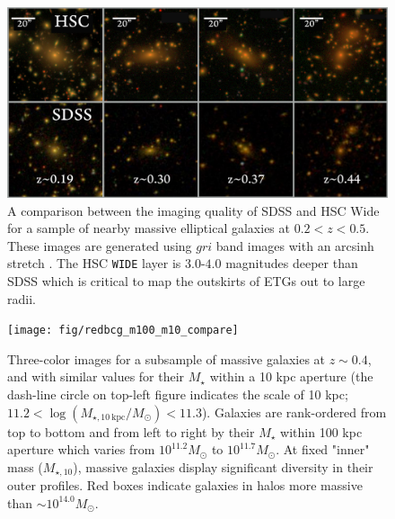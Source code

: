 \documentclass[a4paper,fleqn,usenatbib]{mnras}
\def\mstar{{$M_{\star}$}}
\begin{document}

    \begin{figure}
        \centering 
        \includegraphics[width=\textwidth]{fig/redbcg_sdss_compare}
        \caption{
            A comparison between the imaging quality of SDSS and HSC Wide for a sample 
        	of nearby massive elliptical galaxies at $0.2 < z < 0.5$.  
            These images are generated using $gri$ band images with an arcsinh stretch 
            \citep{Lupton2004}. 
            The HSC \texttt{WIDE} layer is $3.0$-$4.0$ magnitudes deeper than SDSS 
            which is critical to map the outskirts of ETGs out to large radii.
            }
        \label{fig:sdss_compare}
    \end{figure}

  \begin{figure}
      \centering 
      \texttt{[image: fig/redbcg\_m100\_m10\_compare]}
      \caption{
          Three-color images for a subsample of massive galaxies at $z\sim 0.4$, and 
          with similar values for their \mstar{} within a 10 kpc aperture 
          (the dash-line circle on top-left figure indicates the scale of 10 kpc;
          $11.2<\log (M_{\star,10\ \mathrm{kpc}}/M_{\odot})<11.3$). 
          Galaxies are rank-ordered from top to bottom and from left to right by 
          their \mstar{} within 100 kpc aperture which varies from $10^{11.2} M_{\odot}$ 
          to $10^{11.7} M_{\odot}$. 
          At fixed "inner" mass ($M_{\star,10}$), massive galaxies display significant
          diversity in their outer profiles. 
          Red boxes indicate galaxies in halos more massive than 
          $\sim 10^{14.0} M_{\odot}$. 
          }
      \label{fig:m100_m10_color}
  \end{figure}
\end{document}
